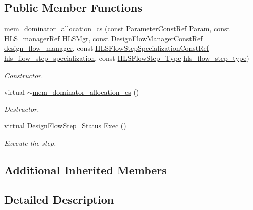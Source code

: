 \subsection*{Public Member Functions}
\begin{DoxyCompactItemize}
\item 
\hyperlink{classmem__dominator__allocation__cs_a2ce0a208ce3b49c9aa8811b5e50fb2d2}{mem\+\_\+dominator\+\_\+allocation\+\_\+cs} (const \hyperlink{Parameter_8hpp_a37841774a6fcb479b597fdf8955eb4ea}{Parameter\+Const\+Ref} Param, const \hyperlink{hls__manager_8hpp_acd3842b8589fe52c08fc0b2fcc813bfe}{H\+L\+S\+\_\+manager\+Ref} \hyperlink{classHLS__step_ade85003a99d34134418451ddc46a18e9}{H\+L\+S\+Mgr}, const Design\+Flow\+Manager\+Const\+Ref \hyperlink{classDesignFlowStep_ab770677ddf087613add30024e16a5554}{design\+\_\+flow\+\_\+manager}, const \hyperlink{hls__step_8hpp_a5fdd2edf290c196531d21d68e13f0e74}{H\+L\+S\+Flow\+Step\+Specialization\+Const\+Ref} \hyperlink{classHLS__step_a843be75ba53b81876aa3c8b870ae8a55}{hls\+\_\+flow\+\_\+step\+\_\+specialization}, const \hyperlink{hls__step_8hpp_ada16bc22905016180e26fc7e39537f8d}{H\+L\+S\+Flow\+Step\+\_\+\+Type} \hyperlink{classHLS__step_aefd59af15346ec3f10bf12bd756e6777}{hls\+\_\+flow\+\_\+step\+\_\+type})
\begin{DoxyCompactList}\small\item\em Constructor. \end{DoxyCompactList}\item 
virtual \hyperlink{classmem__dominator__allocation__cs_a4cb4d31bf03b5b68e6a4b656df1c1a6b}{$\sim$mem\+\_\+dominator\+\_\+allocation\+\_\+cs} ()
\begin{DoxyCompactList}\small\item\em Destructor. \end{DoxyCompactList}\item 
virtual \hyperlink{design__flow__step_8hpp_afb1f0d73069c26076b8d31dbc8ebecdf}{Design\+Flow\+Step\+\_\+\+Status} \hyperlink{classmem__dominator__allocation__cs_a60f6b1d90b9bf041ba3fe87a486b49ec}{Exec} ()
\begin{DoxyCompactList}\small\item\em Execute the step. \end{DoxyCompactList}\end{DoxyCompactItemize}
\subsection*{Additional Inherited Members}


\subsection{Detailed Description}


